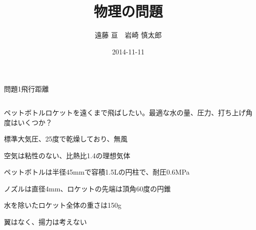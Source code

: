 \documentclass[dvipdfmx]{beamer}
\title[Active Messages]{物理の問題}
\subtitle{}
\author[遠藤 亘　岩崎 慎太郎]{遠藤 亘　岩崎 慎太郎}
\institute[田浦研]{電子情報工学科 4年 田浦研究室}
\date{2014-11-11}
\newenvironment{wideitemize}{\itemize\setlength{\itemsep}{1em}}{\enditemize}
\newenvironment{wideitemize2}{\itemize\setlength{\itemsep}{0.2em}}{\enditemize}
\begin{document}
\begin{frame}
\titlepage
\end{frame}



\begin{frame}{問題1}{飛行距離}
\begin{columns}[t]
\begin{column}{0.7\textwidth}
\begin{wideitemize}
	\item ペットボトルロケットを遠くまで飛ばしたい。最適な水の量、圧力、打ち上げ角度はいくつか？
	\begin{wideitemize2}
		\item 標準大気圧、25度で乾燥しており、無風
		\item 空気は粘性のない、比熱比1.4の理想気体
		\item ペットボトルは半径45mmで容積1.5Lの円柱で、耐圧0.6MPa
		\item ノズルは直径4mm、ロケットの先端は頂角60度の円錐
		\item 水を除いたロケット全体の重さは150g
		\item 翼はなく、揚力は考えない
	\end{wideitemize2}
\end{wideitemize}


\end{column}
\end{columns}
\end{frame}
\end{document}
